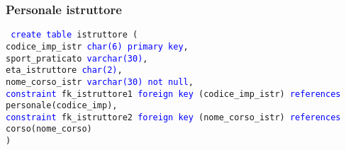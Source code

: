 \documentclass{article}
\begin{document}
    \subsubsection{Personale istruttore}
    \begin{flushleft}
        \texttt{
        \textcolor{blue}{create table} istruttore ( \\
        \hspace*{2em} codice\_imp\_istr \hspace*{1.8em} \textcolor{blue}{char(6)} \hspace*{5.9em} \textcolor{blue}{primary key}, \\
        \hspace*{2em} sport\_praticato \hspace*{1.7em} \textcolor{blue}{varchar(30)}, \\
        \hspace*{2em} eta\_istruttore \hspace*{2.2em} \textcolor{blue}{char(2)}, \\
        \hspace*{2em} nome\_corso\_istr \hspace*{2em} \textcolor{blue}{varchar(30)} \hspace*{3.8em} \textcolor{blue}{not null}, \\
        \hspace*{2em} \textcolor{blue}{constraint} fk\_istruttore1 \textcolor{blue}{foreign key} (codice\_imp\_istr) \textcolor{blue}{references} \hspace*{2em} personale(codice\_imp), \\
        \hspace*{2em} \textcolor{blue}{constraint} fk\_istruttore2 \textcolor{blue}{foreign key} (nome\_corso\_istr) \textcolor{blue}{references} \hspace*{2em} corso(nome\_corso) \\)}
    \end{flushleft}
\end{document}
